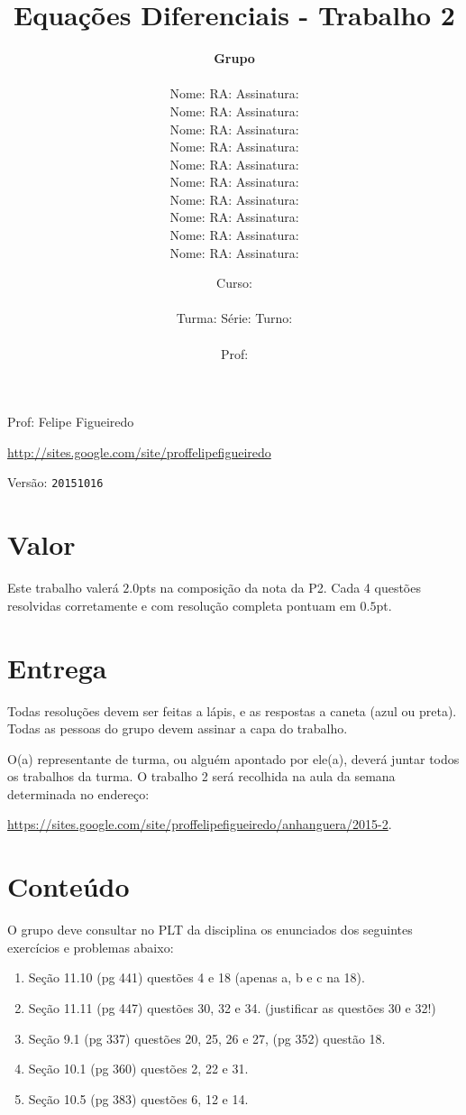 \documentclass[a4paper]{article}
\date{
\bigskip
Curso: \underline{\hspace{8cm}}\\
\ \\
Turma: \underline{\hspace{1cm}} Série: \underline{\hspace{1cm}} Turno:
\underline{\hspace{1cm}}\\
\ \\
Prof: \underline{\hspace{8cm}}\\
}
\title{Equações Diferenciais - Trabalho 2}
\author{
{\bf Grupo}\\
\ \\
Nome: \underline{\hspace{6cm}} RA: \underline{\hspace{2cm}} Assinatura: \underline{\hspace{4cm}}\\
Nome: \underline{\hspace{6cm}} RA: \underline{\hspace{2cm}} Assinatura: \underline{\hspace{4cm}}\\
Nome: \underline{\hspace{6cm}} RA: \underline{\hspace{2cm}} Assinatura: \underline{\hspace{4cm}}\\
Nome: \underline{\hspace{6cm}} RA: \underline{\hspace{2cm}} Assinatura: \underline{\hspace{4cm}}\\
Nome: \underline{\hspace{6cm}} RA: \underline{\hspace{2cm}} Assinatura: \underline{\hspace{4cm}}\\
Nome: \underline{\hspace{6cm}} RA: \underline{\hspace{2cm}} Assinatura: \underline{\hspace{4cm}}\\
Nome: \underline{\hspace{6cm}} RA: \underline{\hspace{2cm}} Assinatura: \underline{\hspace{4cm}}\\
Nome: \underline{\hspace{6cm}} RA: \underline{\hspace{2cm}} Assinatura: \underline{\hspace{4cm}}\\
Nome: \underline{\hspace{6cm}} RA: \underline{\hspace{2cm}} Assinatura: \underline{\hspace{4cm}}\\
Nome: \underline{\hspace{6cm}} RA: \underline{\hspace{2cm}} Assinatura: \underline{\hspace{4cm}}\\
}
\begin{document}
\maketitle

\newpage
\parbox[c]{.825\textwidth}{\raggedright%
{Prof: Felipe Figueiredo\par}
{\url{http://sites.google.com/site/proffelipefigueiredo}\par}
}

Versão: \verb|20151016|




\section{Valor}
Este trabalho valerá $2.0$pts na composição da nota da P2. Cada 4
questões resolvidas corretamente e com resolução completa pontuam em
$0.5$pt.

\section{Entrega}

Todas resoluções devem ser feitas a lápis, e as respostas a caneta
(azul ou preta). Todas as pessoas do grupo devem assinar a capa do
trabalho.

O(a) representante de turma, ou alguém apontado por ele(a), deverá
juntar todos os trabalhos da turma. O trabalho 2 será recolhida na
aula da semana determinada no endereço:

\url{https://sites.google.com/site/proffelipefigueiredo/anhanguera/2015-2}.

\section{Conteúdo}

O grupo deve consultar no PLT da disciplina os enunciados dos
seguintes exercícios e problemas abaixo:

\begin{enumerate}
\item Seção 11.10 (pg 441) questões 4 e 18 (apenas a, b e c na 18).
\item Seção 11.11 (pg 447) questões 30, 32 e 34. (justificar as
  questões 30 e 32!)
\item Seção 9.1   (pg 337) questões 20, 25, 26 e 27, (pg 352) questão 18.
\item Seção 10.1  (pg 360) questões 2, 22 e 31.
\item Seção 10.5  (pg 383) questões 6, 12 e 14.
\end{enumerate}
\end{document}
